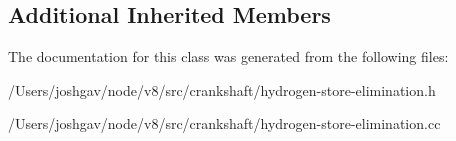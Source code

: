 \subsection*{Additional Inherited Members}


The documentation for this class was generated from the following files\+:\begin{DoxyCompactItemize}
\item 
/\+Users/joshgav/node/v8/src/crankshaft/hydrogen-\/store-\/elimination.\+h\item 
/\+Users/joshgav/node/v8/src/crankshaft/hydrogen-\/store-\/elimination.\+cc\end{DoxyCompactItemize}
